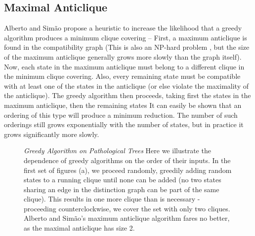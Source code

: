 \subsection{Maximal Anticlique}
Alberto and Sim\~ao \cite{4813796} propose a heuristic to 
increase the likelihood that a greedy algorithm produces a minimum clique covering --
First, a maximum anticlique is found in the compatibility graph (This is also an NP-hard problem \cite{karp72},
but the size of the maximum anticlique generally grows more slowly than the graph itself).
Now, each state in the maximum anticlique must belong to a different clique in the minimum
clique covering.  Also, every remaining state must be compatible with at least one of the states in the 
anticlique (or else violate the maximality of the anticlique).  The greedy algorithm then proceeds,
taking first the states in the maximum anticlique, then the remaining states
It can easily be shown that an ordering of this type will produce a 
minimum reduction.  The number of such orderings still grows exponentially with 
the number of states, but in practice it grows significantly more slowly.
\begin{figure}
\setcounter{subfigure}{0}
\centering
{}
\caption{\emph{Greedy Algorithm on Pathological Trees}
\label{goodbad_order}
Here we illustrate the dependence of greedy algorithms
on the order of their inputs.
In the first set of figures (a), we proceed randomly,
greedily adding random states to a running clique until none can be added
(no two states sharing an edge in the distinction graph can be part of the same clique).
This results in one more clique than is necessary - 
proceeding counterclockwise, we cover the set with only two cliques.
Alberto and Sim\~ao's
maximum anticlique algorithm
fares no better, as the maximal anticlique has size 2.
}
\end{figure}

